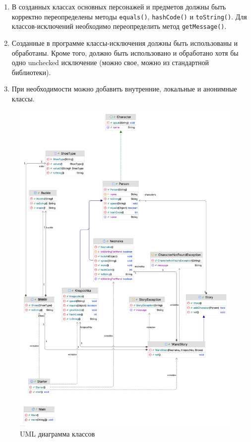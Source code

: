 \begin{enumerate}
\begin{itemize}
        \end{itemize}
        \item В созданных классах основных персонажей и предметов должны быть корректно переопределены методы \verb|equals()|, \verb|hashCode()| и \verb|toString()|.
        Для классов-исключений необходимо переопределить метод \verb|getMessage()|.
        \item Созданные в программе классы-исключения должны быть использованы и обработаны.
        Кроме того, должно быть использовано и обработано хотя бы одно unchecked исключение (можно свое, можно из стандартной библиотеки).
        \item При необходимости можно добавить внутренние, локальные и анонимные классы.
    \end{enumerate}
    \begin{figure}[H] %
        \centering
        \includegraphics[width=\textwidth]{res/diagram}
        \caption{UML диаграмма классов}
        \label{fig:enter-label}
    \end{figure}

